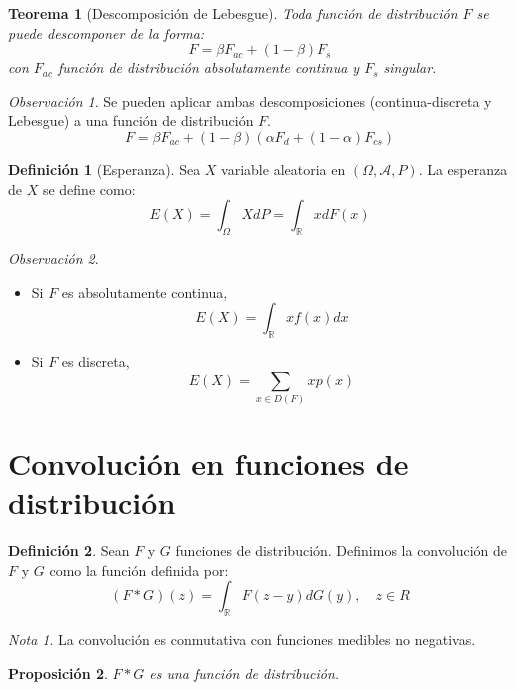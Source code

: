 \documentclass{report}
\newtheorem{theorem}{Teorema}[chapter]
\newtheorem{proposition}[theorem]{Proposición}
\theoremstyle{remark}
\newtheorem*{remark}{Observación}
\theoremstyle{remark}
\newtheorem*{note}{Nota}
\theoremstyle{remark}
\theoremstyle{definition}
\newtheorem{definition}{Definición}[chapter]
\theoremstyle{definition}
\theoremstyle{definition}
\theoremstyle{definition}
\begin{document}
\begin{theorem}[Descomposición de Lebesgue]
    Toda función de distribución $F$ se puede descomponer de la forma:
    $$F = \beta F_{ac} + (1-\beta)F_s$$
    con $F_{ac}$ función de distribución absolutamente continua y $F_s$ singular.
\end{theorem}

\begin{remark}
    Se pueden aplicar ambas descomposiciones (continua-discreta y Lebesgue) a una función de distribución $F$.
    $$F = \beta F_{ac} + (1-\beta) \left( \alpha F_{d} + (1-\alpha)F_{cs} \right)$$
\end{remark}

\begin{definition}[Esperanza]
    Sea $X$ variable aleatoria en $(\Omega, \mathcal{A}, P)$.
    La esperanza de $X$ se define como:
    $$E(X) = \int_\Omega X dP = \int_\mathbb{R} x dF(x)$$
\end{definition}

\begin{remark}
    \hfill
    \begin{itemize}
        \item Si $F$ es absolutamente continua,
              $$E(X) = \int_\mathbb{R} xf(x) dx$$
        \item Si $F$ es discreta,
              $$E(X) = \sum_{x \in D(F)} xp(x)$$
    \end{itemize}
\end{remark}

\section{Convolución en funciones de distribución}

\begin{definition}
    Sean $F$ y $G$ funciones de distribución.
    Definimos la convolución de $F$ y $G$ como la función definida por:
    $$(F \ast G)(z) = \int_\mathbb{R} F(z-y) dG(y), \quad z \in R$$
\end{definition}

\begin{note}
    La convolución es conmutativa con funciones medibles no negativas.
\end{note}

\begin{proposition}
    $F \ast G$ es una función de distribución.
\end{proposition}
\end{document}
